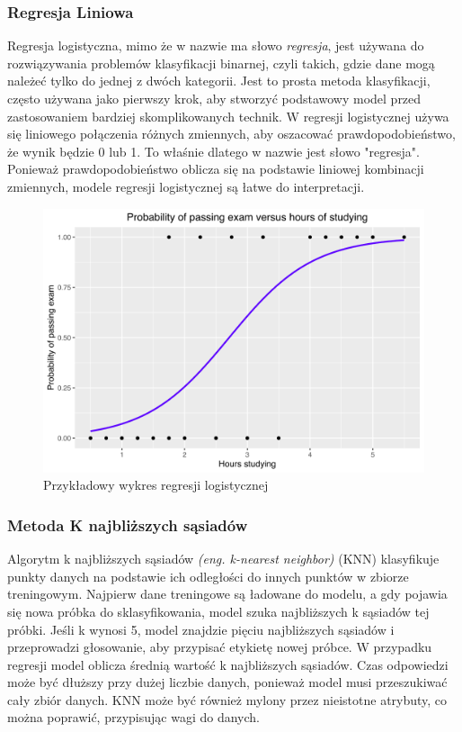 \documentclass[12pt,a4paper]{article}
\begin{document}
\subsubsection{Regresja Liniowa} 
Regresja logistyczna, mimo że w nazwie ma słowo \textit{regresja}, jest używana do rozwiązywania problemów klasyfikacji binarnej, czyli takich, gdzie dane mogą należeć tylko do jednej z dwóch kategorii. Jest to prosta metoda klasyfikacji, często używana jako pierwszy krok, aby stworzyć podstawowy model przed zastosowaniem bardziej skomplikowanych technik. W regresji logistycznej używa się liniowego połączenia różnych zmiennych, aby oszacować prawdopodobieństwo, że wynik będzie 0 lub 1. To właśnie dlatego w nazwie jest słowo "regresja". Ponieważ prawdopodobieństwo oblicza się na podstawie liniowej kombinacji zmiennych, modele regresji logistycznej są łatwe do interpretacji.

\begin{figure}[h]
    \centering
    \includegraphics[width=0.75\linewidth]{images/ligistic-curve.png}
    \caption{Przykładowy wykres regresji logistycznej \cite{logistic-regression-graph}}
\end{figure}

\subsubsection{Metoda K najbliższych sąsiadów} 
Algorytm k najbliższych sąsiadów \textit{(eng. k-nearest neighbor)} (KNN) klasyfikuje punkty danych na podstawie ich odległości do innych punktów w zbiorze treningowym. Najpierw dane treningowe są ładowane do modelu, a gdy pojawia się nowa próbka do sklasyfikowania, model szuka najbliższych k sąsiadów tej próbki. Jeśli k wynosi 5, model znajdzie pięciu najbliższych sąsiadów i przeprowadzi głosowanie, aby przypisać etykietę nowej próbce. W przypadku regresji model oblicza średnią wartość k najbliższych sąsiadów. Czas odpowiedzi może być dłuższy przy dużej liczbie danych, ponieważ model musi przeszukiwać cały zbiór danych. KNN może być również mylony przez nieistotne atrybuty, co można poprawić, przypisując wagi do danych.
\end{document}
